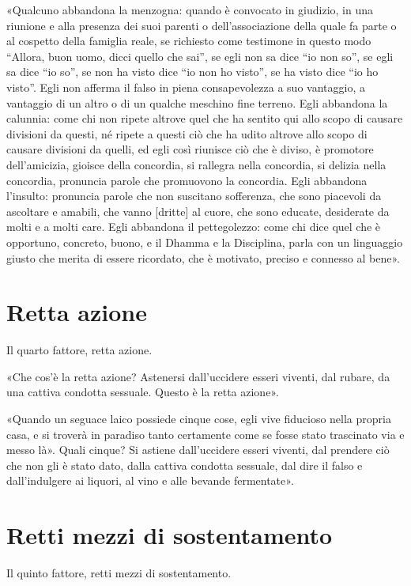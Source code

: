 «Qualcuno abbandona la menzogna: quando è convocato in giudizio, in una
riunione e alla presenza dei suoi parenti o dell’associazione della
quale fa parte o al cospetto della famiglia reale, se richiesto come
testimone in questo modo “Allora, buon uomo, dicci quello che sai”, se
egli non sa dice “io non so”, se egli sa dice “io so”, se non ha visto
dice “io non ho visto”, se ha visto dice “io ho visto”. Egli non afferma
il falso in piena consapevolezza a suo vantaggio, a vantaggio di un
altro o di un qualche meschino fine terreno. Egli abbandona la calunnia:
come chi non ripete altrove quel che ha sentito qui allo scopo di
causare divisioni da questi, né ripete a questi ciò che ha udito altrove
allo scopo di causare divisioni da quelli, ed egli così riunisce ciò che
è diviso, è promotore dell’amicizia, gioisce della concordia, si
rallegra nella concordia, si delizia nella concordia, pronuncia parole
che promuovono la concordia. Egli abbandona l’insulto: pronuncia parole
che non suscitano sofferenza, che sono piacevoli da ascoltare e amabili,
che vanno [dritte] al cuore, che sono educate, desiderate da molti e a
molti care. Egli abbandona il pettegolezzo: come chi dice quel che è
opportuno, concreto, buono, e il Dhamma e la Disciplina, parla con un
linguaggio giusto che merita di essere ricordato, che è motivato,
preciso e connesso al bene».




\hypertarget{x-retta-azione}{\section*{Retta azione}}
 Il quarto fattore, retta azione.


 «Che cos’è la retta azione? Astenersi dall’uccidere esseri
viventi, dal rubare, da una cattiva condotta sessuale. Questo è la retta
azione».




«Quando un seguace laico possiede cinque cose, egli vive fiducioso nella
propria casa, e si troverà in paradiso tanto certamente come se fosse
stato trascinato via e messo là». Quali cinque? Si astiene dall’uccidere
esseri viventi, dal prendere ciò che non gli è stato dato, dalla cattiva
condotta sessuale, dal dire il falso e dall’indulgere ai liquori, al
vino e alle bevande fermentate».




\hypertarget{x-retti-mezzi-di-sostentamento}{\section*{Retti mezzi di sostentamento}}
 Il quinto fattore, retti mezzi di sostentamento.


